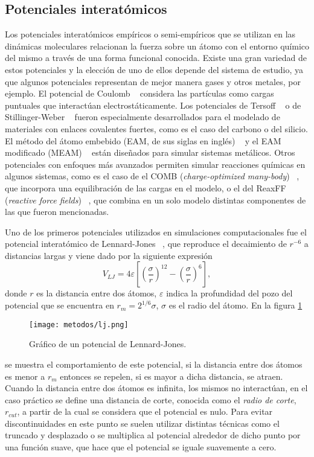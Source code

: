 \subsection{Potenciales interatómicos}

Los potenciales interatómicos empíricos o semi-empíricos que se utilizan en las
dinámicas moleculares relacionan la fuerza sobre un átomo con el entorno químico 
del mismo a través de una forma funcional conocida. Existe una gran 
variedad de estos potenciales y la elección de uno de ellos depende del sistema 
de estudio, ya que algunos potenciales representan de mejor manera gases y otros 
metales, por ejemplo. El potencial de Coulomb ~\cite{coulomb} considera las 
partículas como cargas puntuales que interactúan electrostáticamente. Los 
potenciales de Tersoff ~\cite{tersoff} o de Stillinger-Weber 
~\cite{stillinger-weber} fueron especialmente desarrollados para el modelado de 
materiales con enlaces covalentes fuertes, como es el caso del carbono o del 
silicio. El método del átomo embebido (EAM, de sus siglas en inglés) ~\cite{eam} 
y el EAM modificado (MEAM) ~\cite{meam} están diseñados para simular sistemas 
metálicos. Otros potenciales con enfoques más avanzados permiten simular
reacciones químicas en algunos sistemas, como es el caso de el COMB 
(\textit{charge-optimized many-body}) ~\cite{comb}, que incorpora una 
equilibración de las cargas en el modelo, o el del ReaxFF (\textit{reactive 
force fields}) ~\cite{reaxff}, que combina en un solo modelo distintas componentes
de las que fueron mencionadas.

Uno de los primeros potenciales utilizados en simulaciones computacionales fue 
el potencial interatómico de Lennard-Jones ~\cite{lennard-jones}, que reproduce 
el decaimiento de $r^{-6}$ a distancias largas y viene dado por la siguiente 
expresión
$$
V_{LJ} = 4\varepsilon \left[ \left( \frac{\sigma}{r} \right)^{12} - \left( \frac{\sigma}{r} \right)^{6} \right],
$$
donde $r$ es la distancia entre dos átomos, $\varepsilon$ indica la profundidad 
del pozo del potencial que se encuentra en $r_m = 2^{1/6} \sigma$, $\sigma$ es el
radio del átomo. En la figura \ref{fig:lj} 
\begin{figure}
    \centering
    \texttt{[image: metodos/lj.png]}
    \caption{Gráfico de un potencial de Lennard-Jones.}
    \label{fig:lj}
\end{figure}
se muestra el comportamiento de este potencial, si la distancia entre dos
átomos es menor a $r_m$ entonces se repelen, si es mayor a dicha distancia, se 
atraen. Cuando la distancia entre dos átomos es infinita, los mismos no 
interactúan, en el caso práctico se define una distancia de corte, conocida como
el \textit{radio de corte}, $r_{cut}$, a partir de la cual se considera que el 
potencial es nulo. Para evitar discontinuidades en este punto se suelen utilizar 
distintas técnicas como el truncado y desplazado o se multiplica al potencial 
alrededor de dicho punto por una función suave, que hace que el potencial se 
iguale suavemente a cero.


